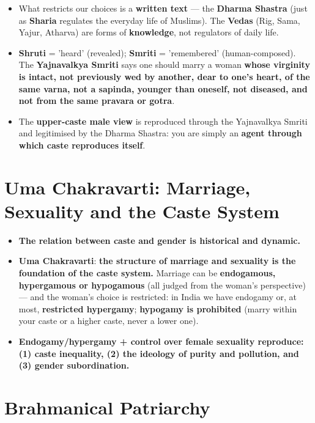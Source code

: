 \begin{KeyConcept}
\begin{itemize}
\item What restricts our choices is a \textbf{written text} --- the \textbf{Dharma Shastra} (just as \textbf{Sharia} regulates the everyday life of Muslims). The \textbf{Vedas} (Rig, Sama, Yajur, Atharva) are forms of \textbf{knowledge}, not regulators of daily life.
\item \textbf{Shruti} = 'heard' (revealed); \textbf{Smriti} = 'remembered' (human-composed). The \textbf{Yajnavalkya Smriti} says one should marry a woman \textbf{whose virginity is intact, not previously wed by another, dear to one's heart, of the same varna, not a sapinda, younger than oneself, not diseased, and not from the same pravara or gotra}.
\item The \textbf{upper-caste male view} is reproduced through the Yajnavalkya Smriti and legitimised by the Dharma Shastra: you are simply an \textbf{agent through which caste reproduces itself}.
\end{itemize}
\end{KeyConcept}

\section{Uma Chakravarti: Marriage, Sexuality and the Caste System}

\begin{KeyConcept}
\begin{itemize}
\item \textbf{The relation between caste and gender is historical and dynamic.}
\item \textbf{Uma Chakravarti}: \textbf{the structure of marriage and sexuality is the foundation of the caste system.} Marriage can be \textbf{endogamous, hypergamous or hypogamous} (all judged from the woman's perspective) --- and the woman's choice is restricted: in India we have endogamy or, at most, \textbf{restricted hypergamy}; \textbf{hypogamy is prohibited} (marry within your caste or a higher caste, never a lower one).
\item \textbf{Endogamy/hypergamy + control over female sexuality reproduce: (1) caste inequality, (2) the ideology of purity and pollution, and (3) gender subordination.}
\end{itemize}
\end{KeyConcept}

\section{Brahmanical Patriarchy}

